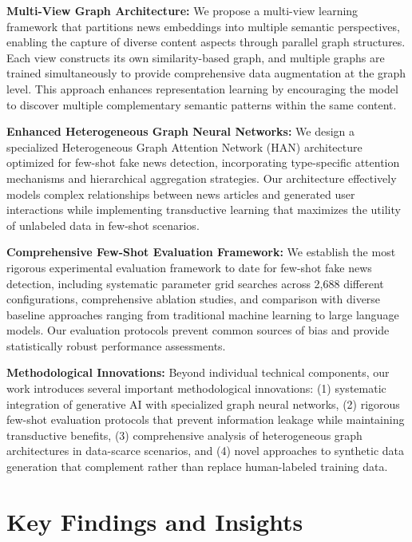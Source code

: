 \textbf{Multi-View Graph Architecture:} We propose a multi-view learning framework that partitions news embeddings into multiple semantic perspectives, enabling the capture of diverse content aspects through parallel graph structures. Each view constructs its own similarity-based graph, and multiple graphs are trained simultaneously to provide comprehensive data augmentation at the graph level. This approach enhances representation learning by encouraging the model to discover multiple complementary semantic patterns within the same content.

\textbf{Enhanced Heterogeneous Graph Neural Networks:} We design a specialized Heterogeneous Graph Attention Network (HAN) architecture optimized for few-shot fake news detection, incorporating type-specific attention mechanisms and hierarchical aggregation strategies. Our architecture effectively models complex relationships between news articles and generated user interactions while implementing transductive learning that maximizes the utility of unlabeled data in few-shot scenarios.


\textbf{Comprehensive Few-Shot Evaluation Framework:} We establish the most rigorous experimental evaluation framework to date for few-shot fake news detection, including systematic parameter grid searches across 2,688 different configurations, comprehensive ablation studies, and comparison with diverse baseline approaches ranging from traditional machine learning to large language models. Our evaluation protocols prevent common sources of bias and provide statistically robust performance assessments.

\textbf{Methodological Innovations:} Beyond individual technical components, our work introduces several important methodological innovations: (1) systematic integration of generative AI with specialized graph neural networks, (2) rigorous few-shot evaluation protocols that prevent information leakage while maintaining transductive benefits, (3) comprehensive analysis of heterogeneous graph architectures in data-scarce scenarios, and (4) novel approaches to synthetic data generation that complement rather than replace human-labeled training data.

\section{Key Findings and Insights}

